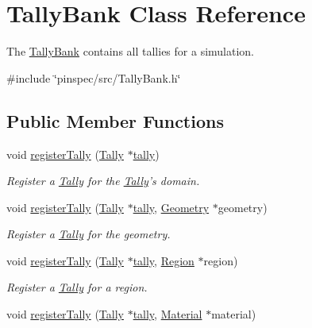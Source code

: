 \hypertarget{classTallyBank}{\section{Tally\-Bank Class Reference}
\label{classTallyBank}
}


The \hyperlink{classTallyBank}{Tally\-Bank} contains all tallies for a simulation.  




{\ttfamily \#include \char`\"{}pinspec/src/\-Tally\-Bank.\-h\char`\"{}}

\subsection*{Public Member Functions}
\begin{DoxyCompactItemize}
\item 
void \hyperlink{classTallyBank_a90ee52a423f9957f92c6727f7fe4d549}{register\-Tally} (\hyperlink{classTally}{Tally} $\ast$\hyperlink{classTallyBank_a929908afec2f18a4321b29beb52877f2}{tally})
\begin{DoxyCompactList}\small\item\em Register a \hyperlink{classTally}{Tally} for the \hyperlink{classTally}{Tally}'s domain. \end{DoxyCompactList}\item 
void \hyperlink{classTallyBank_a91534dfefd753e4a5d907edc97eb35d1}{register\-Tally} (\hyperlink{classTally}{Tally} $\ast$\hyperlink{classTallyBank_a929908afec2f18a4321b29beb52877f2}{tally}, \hyperlink{classGeometry}{Geometry} $\ast$geometry)
\begin{DoxyCompactList}\small\item\em Register a \hyperlink{classTally}{Tally} for the geometry. \end{DoxyCompactList}\item 
void \hyperlink{classTallyBank_a796fc4a2a42ea1065743d2bf51b5d69c}{register\-Tally} (\hyperlink{classTally}{Tally} $\ast$\hyperlink{classTallyBank_a929908afec2f18a4321b29beb52877f2}{tally}, \hyperlink{classRegion}{Region} $\ast$region)
\begin{DoxyCompactList}\small\item\em Register a \hyperlink{classTally}{Tally} for a region. \end{DoxyCompactList}\item 
void \hyperlink{classTallyBank_a66e05cdee146e7740b211c6037672226}{register\-Tally} (\hyperlink{classTally}{Tally} $\ast$\hyperlink{classTallyBank_a929908afec2f18a4321b29beb52877f2}{tally}, \hyperlink{classMaterial}{Material} $\ast$material)

\end{DoxyCompactItemize}
